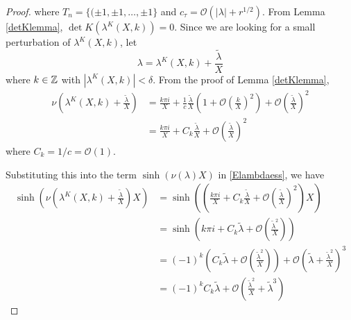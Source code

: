\documentclass[thesis.tex]{subfiles}
\begin{document}
\begin{lemma}
\begin{proof}
where $T_n = \{ (\pm 1, \pm 1, \dots, \pm 1 \}$ and $c_\tau = \mathcal{O}(|\lambda| + r^{1/2})$. From Lemma \ref{detKlemma}, $\det K(\lambda^K(X,k)) = 0$. Since we are looking for a small perturbation of $\lambda^K(X,k)$, let
\begin{equation}\label{tildelambdadef}
\lambda = \lambda^K(X,k) + \frac{\tilde{\lambda}}{X}
\end{equation}
where $k \in \mathbb{Z}$ with $|\lambda^K(X,k)| < \delta$. From the proof of Lemma \ref{detKlemma}, 
\begin{align*}
\nu\left( \lambda^K(X, k) + \frac{\tilde{\lambda}}{X} \right) 
&= \frac{k \pi i}{X} + \frac{1}{c}\frac{\tilde{\lambda}}{X} \left( 1 + \mathcal{O} \left(\frac{k}{X}\right)^2 \right) + \mathcal{O}\left( \frac{\tilde{\lambda}}{X}\right)^2 \\
&= \frac{k \pi i}{X} + C_k \frac{\tilde{\lambda}}{X} + \mathcal{O}\left( \frac{\tilde{\lambda}}{X}\right)^2 
\end{align*}
where $C_k = 1/c = \mathcal{O}(1)$. 

Substituting this into the term $\sinh(\nu(\lambda)X)$ in \eqref{Elambdaess}, we have
\begin{align*}
\sinh\left(\nu\left(\lambda^K(X, k) + \frac{\tilde{\lambda}}{X}\right)X\right)
&= \sinh\left(\left(\frac{k \pi i}{X} + C_k \frac{\tilde{\lambda}}{X} + \mathcal{O}\left( \frac{\tilde{\lambda}}{X}\right)^2 \right) X\right) \\
&= \sinh\left( k \pi i + C_k \tilde{\lambda} + \mathcal{O}\left( \frac{\tilde{\lambda}^2}{X}\right) \right) \\
&= (-1)^k \left( C_k \tilde{\lambda} + \mathcal{O}\left( \frac{\tilde{\lambda}^2}{X}\right) \right) + \mathcal{O}\left( \tilde{\lambda} + \frac{\tilde{\lambda}^2}{X} \right)^3 \\
&= (-1)^k C_k \tilde{\lambda} + \mathcal{O}\left( \frac{\tilde{\lambda}^2}{X} + \tilde{\lambda}^3 \right)
\end{align*}


\end{proof}
\end{lemma}
\end{document}
